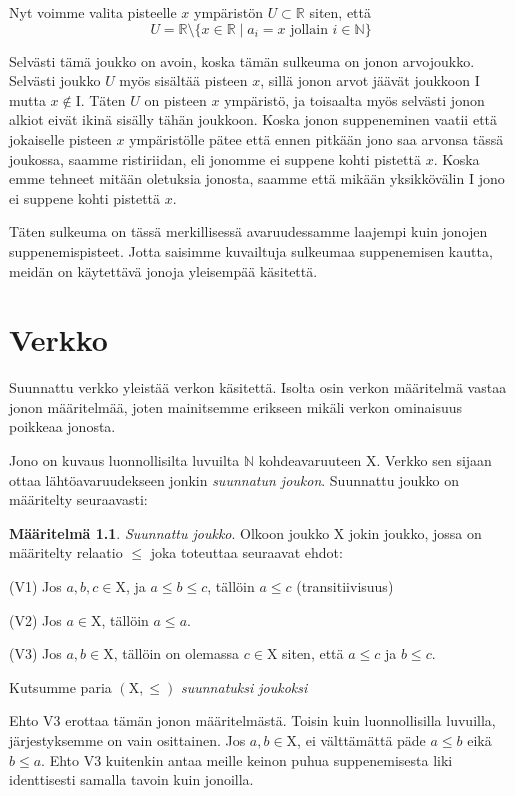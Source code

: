 \documentclass[12pt,a4paper,leqno]{report}
\newcommand{\R}{\mathbb{R}}
\newcommand{\N}{\mathbb{N}}
\newcommand{\X}{\mathrm{X}}
\newcommand{\I}{\mathrm{I}}
\newcommand{\verkop}{\leq}
\theoremstyle{plain}
\theoremstyle{definition}
\newtheorem{maar}[equation]{Määritelmä}
\theoremstyle{remark}
\begin{document}
Nyt voimme valita pisteelle $x$ ympäristön $U \subset \R$ siten, että
\begin{equation}
U = \R \setminus \{x \in \R \mid a_i = x \text{ jollain } i \in \N \}
\end{equation}

Selvästi tämä joukko on avoin, koska tämän sulkeuma on jonon arvojoukko. Selvästi joukko $U$ myös sisältää pisteen $x$, sillä jonon arvot jäävät joukkoon $\I$ mutta $x \not\in \I$. Täten $U$ on pisteen $x$ ympäristö, ja toisaalta myös selvästi jonon alkiot eivät ikinä sisälly tähän joukkoon. Koska jonon suppeneminen vaatii että jokaiselle pisteen $x$ ympäristölle pätee että ennen pitkään jono saa arvonsa tässä joukossa, saamme ristiriidan, eli jonomme ei suppene kohti pistettä $x$. Koska emme tehneet mitään oletuksia jonosta, saamme että mikään yksikkövälin $\I$ jono ei suppene kohti pistettä $x$.

Täten sulkeuma on tässä merkillisessä avaruudessamme laajempi kuin jonojen suppenemispisteet. Jotta saisimme kuvailtuja sulkeumaa suppenemisen kautta, meidän on käytettävä jonoja yleisempää käsitettä.

\chapter{Verkko}

Suunnattu verkko yleistää verkon käsitettä. Isolta osin verkon määritelmä vastaa jonon määritelmää, joten mainitsemme erikseen mikäli verkon ominaisuus poikkeaa jonosta.

Jono on kuvaus luonnollisilta luvuilta $\N$ kohdeavaruuteen $\X$. Verkko sen sijaan ottaa lähtöavaruudekseen jonkin \emph{suunnatun joukon}. Suunnattu joukko on määritelty seuraavasti:

\begin{maar}\label{suunjoukmaar}
\emph{Suunnattu joukko}. Olkoon joukko $\X$ jokin joukko, jossa on määritelty relaatio $\verkop$ joka toteuttaa seuraavat ehdot:

(V1) Jos $a, b, c \in \X$, ja $a \verkop b \verkop c$, tällöin $a \verkop c$ (transitiivisuus)

(V2) Jos $a \in \X$, tällöin $a \verkop a$.

(V3) Jos $a, b \in \X$, tällöin on olemassa $c \in \X$ siten, että $a \verkop c$ ja $b \verkop c$.

Kutsumme paria $(\X, \verkop)$ \emph{suunnatuksi joukoksi}
\end{maar}

Ehto V3 erottaa tämän jonon määritelmästä. Toisin kuin luonnollisilla luvuilla, järjestyksemme on vain osittainen. Jos $a, b \in \X$, ei välttämättä päde $a \verkop b$ eikä $b \verkop a$. Ehto V3 kuitenkin antaa meille keinon puhua suppenemisesta liki identtisesti samalla tavoin kuin jonoilla.
\end{document}
